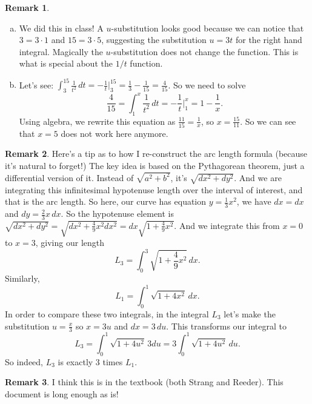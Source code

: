 \documentclass[11pt,oneside]{amsart}
\theoremstyle{definition}
\newtheorem{remark}{Remark}
\begin{document}
\begin{remark}
  \leavevmode\begin{enumerate}[(a)]
    \item We did this in class! A $u$-substitution looks good because we can notice that $3=3\cdot 1$ and $15=3\cdot 5$, suggesting the substitution $u=3t$ for the right hand integral. Magically the $u$-substitution does not change the function. This is what is special about the $1/t$ function.
    \item Let's see: $\int_3^{15}\frac 1{t^2}\,dt=-\frac 1t\Big|_3^{15}=\frac 13-\frac 1{15}=\frac 4{15}$. So we need to solve
          \[\frac 4{15}=\int_1^x\frac 1{t^2}\,dt=-\frac 1t\Big|_1^x=1-\frac 1x.\]
          Using algebra, we rewrite this equation as $\frac{11}{15}=\frac 1x$, so $x=\frac{15}{11}$. So we can see that $x=5$ does not work here anymore.
  \end{enumerate}
\end{remark}

\begin{remark}
  Here's a tip as to how I re-construct the arc length formula (because it's natural to forget!) The key idea is based on the Pythagorean theorem, just a differential version of it. Instead of $\sqrt{a^2+b^2}$, it's $\sqrt{dx^2+dy^2}$. And we are integrating this infinitesimal hypotenuse length over the interval of interest, and that is the arc length. So here, our curve has equation $y=\frac 13x^2$, we have $dx=dx$ and $dy=\frac 23x\,dx$. So the hypotenuse element is $\sqrt{dx^2+dy^2}=\sqrt{dx^2+\frac 49x^2 dx^2}=dx\sqrt{1+\frac 49x^2}$. And we integrate this from $x=0$ to $x=3$, giving our length
  \[L_3=\int_0^3\sqrt{1+\frac 49x^2}\,dx.\]
  Similarly,
  \[L_1=\int_0^1\sqrt{1+4x^2}\,dx.\]
  In order to compare these two integrals, in the integral $L_3$ let's make the substitution $u=\frac x3$ so $x=3u$ and $dx=3\,du$. This transforms our integral to
  \[L_3=\int_0^1\sqrt{1+4u^2}\,3du=3\int_0^1\sqrt{1+4u^2}\,du.\]
  So indeed, $L_3$ is exactly 3 times $L_1$.
\end{remark}

\begin{remark}
  I think this is in the textbook (both Strang and Reeder). This document is long enough as is!
\end{remark}
\end{document}
